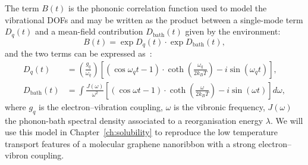 The term $B(t)$ is the phononic correlation function used to model the vibrational \glspl{DOF} and may be written as the product between a single-mode term $D_q (t)$ and a mean-field contribution $D_\textrm{bath}(t)$ given by the environment:
%
\begin{equation}
    B(t)=\exp{D_{q}(t)} \cdot \exp{D_{\textrm{bath}}(t)},
\end{equation}
%
and the two terms can be expressed as~\cite{todd1994electron}:
%
\begin{align}
    D_{q}(t)         & = \left(\frac{g_{q}}{\omega_{q}}\right)\left[\left(\cos \omega_{q} t-1\right) \cdot \operatorname{coth}\left(\frac{\omega_{q}}{2 k_{B} T}\right)-i \sin \left(\omega_{q} t\right)\right], \\
    D_\text{bath}(t) & = \int \frac{J(\omega)}{\omega^{2}}\left[(\cos \omega t-1) \cdot \operatorname{coth}\left(\frac{\omega}{2 k_{B} T}\right)-i \sin (\omega t)\right] d\omega,
    \label{eq:final_vibration_equation}
\end{align}
%
where $g_{q}$ is the electron--vibration coupling, $\omega$ is the vibronic frequency, $J(\omega)$ the phonon-bath spectral density associated to a reorganisation energy $\lambda$. We will use this model in Chapter~\ref{ch:solubility} to reproduce the low temperature transport features of a molecular graphene nanoribbon with a strong electron--vibron coupling.

